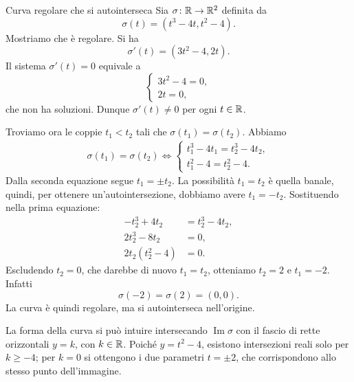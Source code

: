 \documentclass[a4paper]{article}
\begin{document}
\begin{snippetexample}{Curva regolare che si autointerseca}
Sia \(\sigma\colon \mathbb{R}\to \mathbb{R}^2\) definita da
\[
    \sigma(t)=\left(t^3-4t,t^2-4\right).
\]
Mostriamo che è regolare. Si ha
\[
    \sigma'(t)=\left(3t^2-4,2t\right).
\]
Il sistema \(\sigma'(t)=0\) equivale a
\[
    \begin{cases}
        3t^2-4=0,\\
        2t=0,
    \end{cases}
\]
che non ha soluzioni. Dunque \(\sigma'(t)\neq 0\) per ogni \(t\in\mathbb{R}\).

Troviamo ora le coppie \(t_1<t_2\) tali che \(\sigma(t_1)=\sigma(t_2)\). Abbiamo
\begin{align*}
    \sigma(t_1)=\sigma(t_2)
    \iff
    \begin{cases}
        t_1^3-4t_1=t_2^3-4t_2,\\
        t_1^2-4=t_2^2-4.
    \end{cases}
\end{align*}
Dalla seconda equazione segue \(t_1=\pm t_2\). La possibilità \(t_1=t_2\) è quella banale, quindi, per ottenere un'autointersezione, dobbiamo avere \(t_1=-t_2\). Sostituendo nella prima equazione:
\begin{align*}
    -t_2^3+4t_2 &= t_2^3-4t_2,\\
    2t_2^3-8t_2 &=0,\\
    2t_2(t_2^2-4)&=0.
\end{align*}
Escludendo \(t_2=0\), che darebbe di nuovo \(t_1=t_2\), otteniamo \(t_2=2\) e \(t_1=-2\). Infatti
\[
    \sigma(-2)=\sigma(2)=(0,0).
\]
La curva è quindi regolare, ma si autointerseca nell'origine.

La forma della curva si può intuire intersecando \(\operatorname{Im}\sigma\) con il fascio di rette orizzontali \(y=k\), con \(k\in\mathbb{R}\). Poiché \(y=t^2-4\), esistono intersezioni reali solo per \(k\geq -4\); per \(k=0\) si ottengono i due parametri \(t=\pm 2\), che corrispondono allo stesso punto dell'immagine.

\begin{center}
\end{center}
\end{snippetexample}
\end{document}
